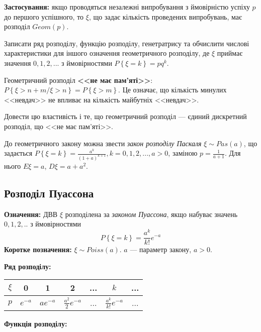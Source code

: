 \noindent\textbf{Застосування:} якщо проводяться незалежні випробування з ймовірністю успіху $p$ до першого успішного,
то $\xi$, що задає кількість проведених випробувань, має розподіл ${Geom}(p)$.

\begin{exercise}
    Записати ряд розподілу, функцію розподілу, генетратрису та обчислити
    числові характеристики для іншого означення геометричного розподілу, 
    де $\xi$ приймає значення $0,1,2,...$ з ймовірностями $P\left\{\xi = k\right\} = pq^k$.
\end{exercise}
Геометричний розподіл \textbf{<<не має пам'яті>>}: $P\left\{\xi>n+m / \xi>n\right\} = P\left\{\xi>m\right\}$.
Це означає, що кількість минулих <<невдач>> не впливає на кількість майбутніх <<невдач>>.
\begin{exercise}
    Довести цю властивість і те, що геометричний розподіл --- 
    єдиний дискретний розподіл, що <<не має пам'яті>>.
\end{exercise}
До геометричного закону можна звести \emph{закон розподілу Паскаля} $\xi \sim {Pas}(a)$,
що задається $P\left\{\xi = k\right\} = \frac{a^k}{(1+a)^{k+1}}, k = 0,1,2,..., a>0$,
заміною $p=\frac{1}{a+1}$. Для нього $E\xi = a$, $D\xi = a + a^2$.

\subsection{Розподіл Пуассона}
\noindent\textbf{Означення:}
    ДВВ $\xi$ розподілена за \emph{законом Пуассона}, 
    якщо набуває значень $0,1,2,..$ з ймовірностями \begin{equation}
        P\left\{\xi = k\right\} = \frac{a^k}{k!}e^{-a}
    \end{equation}
    \textbf{Коротке позначення:} $\xi \sim {Poiss}(a)$.
    $a$ --- параметр закону, $a > 0$.

\noindent\textbf{Ряд розподілу:}

\begin{tabular}{c|c|c|c|c|c|c}
    $\xi$ & 0 & 1 & 2 & ... & $k$ & ... \\
    \hline
    $p$ & $e^{-a}$ & $ae^{-a}$ & $\frac{a^2}{2}e^{-a}$ & ... & $\frac{a^k}{k!}e^{-a}$ & ...
\end{tabular}

\noindent\textbf{Функція розподілу:}

